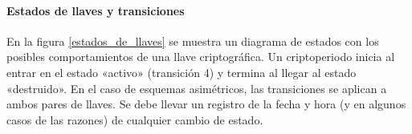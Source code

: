 %
%
%
%
%
%
%
%

\paragraph{Estados de llaves y transiciones}

En la figura \ref{estados_de_llaves} se muestra un diagrama de estados con
los posibles comportamientos de una llave criptográfica. Un criptoperiodo
inicia al entrar en el estado «activo» (transición 4) y termina al llegar al
estado «destruido». En el caso de esquemas asimétricos, las transiciones se
aplican a ambos pares de llaves. Se debe llevar un registro de la fecha y hora
(y en algunos casos de las razones) de cualquier cambio de estado.

